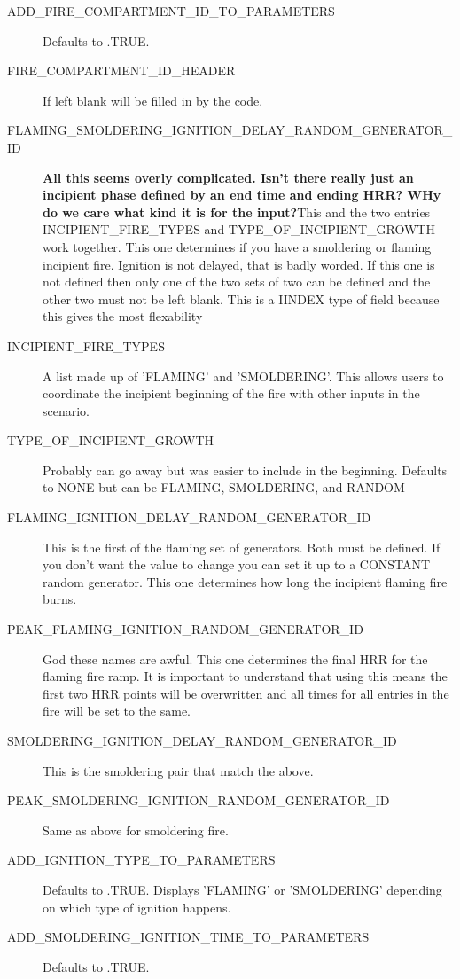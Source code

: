 \documentclass[12pt,twoside]{book}
\begin{document}
\begin{description}
  \item[ADD\_FIRE\_COMPARTMENT\_ID\_TO\_PARAMETERS] Defaults to {\ct .TRUE.}
  \item[FIRE\_COMPARTMENT\_ID\_HEADER] If left blank will be filled in by the code.
  \item[FLAMING\_SMOLDERING\_IGNITION\_DELAY\_RANDOM\_GENERATOR\_ID] \textbf{All this seems overly complicated. Isn't there really just an incipient phase defined by an end time and ending HRR? WHy do we care what kind it is for the input?}This and the two entries {\ct INCIPIENT\_FIRE\_TYPES} and {\ct TYPE\_OF\_INCIPIENT\_GROWTH} work together. This one determines if you have a smoldering or flaming incipient fire. Ignition is not delayed, that is badly worded. If this one is not defined then only one of the two sets of two can be defined and the other two must not be left blank. This is a I{\ct INDEX} type of field because this gives the most flexability
  \item[INCIPIENT\_FIRE\_TYPES] A list made up of 'FLAMING' and 'SMOLDERING'. This allows users to coordinate the incipient beginning of the fire with other inputs in the scenario.
  \item[TYPE\_OF\_INCIPIENT\_GROWTH] Probably can go away but was easier to include in the beginning. Defaults to {\ct NONE} but can be {\ct FLAMING}, {\ct SMOLDERING}, and {\ct RANDOM}
  \item[FLAMING\_IGNITION\_DELAY\_RANDOM\_GENERATOR\_ID] This is the first of the flaming set of generators. Both must be defined. If you don’t want the value to change you can set it up to a {\ct CONSTANT} random generator. This one determines how long the incipient flaming fire burns.
  \item[PEAK\_FLAMING\_IGNITION\_RANDOM\_GENERATOR\_ID] God these names are awful. This one determines the final HRR for the flaming fire ramp. It is important to understand that using this means the first two HRR points will be overwritten and all times for all entries in the fire will be set to the same.
  \item[SMOLDERING\_IGNITION\_DELAY\_RANDOM\_GENERATOR\_ID] This is the smoldering pair that match the above.
  \item[PEAK\_SMOLDERING\_IGNITION\_RANDOM\_GENERATOR\_ID] Same as above for smoldering fire.
  \item[ADD\_IGNITION\_TYPE\_TO\_PARAMETERS] Defaults to {\ct .TRUE.} Displays 'FLAMING' or 'SMOLDERING' depending on which type of ignition happens.
  \item[ADD\_SMOLDERING\_IGNITION\_TIME\_TO\_PARAMETERS] Defaults to {\ct .TRUE.}

\end{description}
\end{document}
